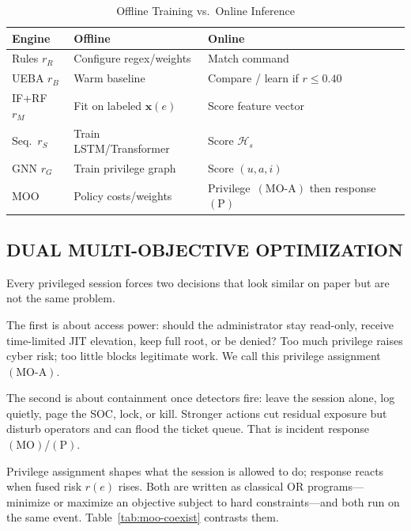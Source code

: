 \documentclass{ieeeaccess}
\begin{document}
\begin{table}[!t]
\caption{Offline Training vs.\ Online Inference}
\label{tab:train-infer}
\centering
\scriptsize
\begin{tabular}{@{}l p{} p{}@{}}
\toprule
\textbf{Engine} & \textbf{Offline} & \textbf{Online} \\
\midrule
Rules $r_R$ & Configure regex/weights & Match command \\
UEBA $r_B$ & Warm baseline & Compare / learn if $r\leq 0.40$ \\
IF+RF $r_M$ & Fit on labeled $\mathbf{x}(e)$ & Score feature vector \\
Seq.\ $r_S$ & Train LSTM/Transformer & Score $\mathcal{H}_s$ \\
GNN $r_G$ & Train privilege graph & Score $(u,a,i)$ \\
MOO & Policy costs/weights & Privilege~$(\mathrm{MO}\text{-}\mathrm{A})$ then response~$(\mathrm{P})$ \\
\bottomrule
\end{tabular}
\end{table}

\subsection{DUAL MULTI-OBJECTIVE OPTIMIZATION}
Every privileged session forces two decisions that look similar on paper but are not the same problem.

The first is about access power: should the administrator stay read-only, receive time-limited JIT elevation, keep full root, or be denied? Too much privilege raises cyber risk; too little blocks legitimate work. We call this privilege assignment~$(\mathrm{MO}\text{-}\mathrm{A})$.

The second is about containment once detectors fire: leave the session alone, log quietly, page the SOC, lock, or kill. Stronger actions cut residual exposure but disturb operators and can flood the ticket queue. That is incident response~$(\mathrm{MO})$/$(\mathrm{P})$.

Privilege assignment shapes what the session is allowed to do; response reacts when fused risk $r(e)$ rises. Both are written as classical OR programs---minimize or maximize an objective subject to hard constraints---and both run on the same event. Table~\ref{tab:moo-coexist} contrasts them.
\end{document}
